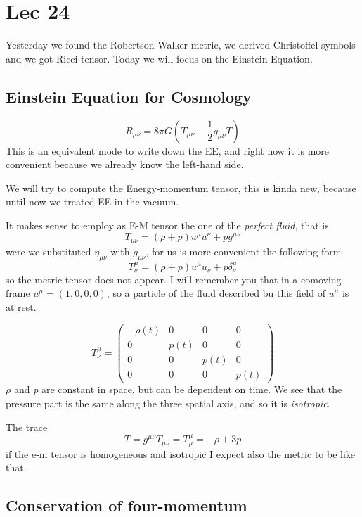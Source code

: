\section{Lec 24}
Yesterday we found the Robertson-Walker metric, we derived Christoffel symbols and we got Ricci tensor. Today we will focus on the Einstein Equation.
\subsection{Einstein Equation for Cosmology}
\[
R_{\mu \nu } = 8\pi G \left( T_{\mu \nu } - \frac{1}{2}g_{\mu \nu }T \right)
\]
This is an equivalent mode to write down the EE, and right now it is more convenient because we already know the left-hand side. \par
We will try to compute the Energy-momentum tensor, this is kinda new, because until now we treated EE in the vacuum.

It makes sense to employ as E-M tensor the one of the \emph{perfect fluid},  that is
\[
T_{\mu \nu } = \left( \rho +p \right)u^{\mu }u^{\nu }+ pg^{\mu \nu }
\]
were we substituted $\eta _{\mu \nu }$ with $g_{\mu \nu }$,  for us is more convenient the following form
\[
T^{\mu }_{\nu } = \left( \rho +p \right)u^{\mu }u_{\nu }+ p \delta ^{\mu }_{\nu }
\]
so the metric tensor does not appear.
I will remember you that in a comoving frame $u^{\mu } = \left( 1,0,0,0 \right)	$, so a particle of the fluid described bu this field of $u^{\mu }$ is at rest.	\par
\[
T^{\mu }_{\nu } = \begin{pmatrix}
-\rho \left( t \right) & 0 & 0 & 0 \\
0 & p\left( t \right) & 0 & 0 \\
0 & 0 & p\left( t \right) & 0 \\
0 & 0 & 0 & p\left( t \right)
\end{pmatrix} 
\]
$\rho $ and \emph{p} are constant in space, but can be dependent on time. We see that the pressure part is the same along the three spatial axis, and so it is \emph{isotropic}. \par
The trace
\[
T = g^{\mu \nu }T_{\mu \nu }= T^{\mu }_{\mu }=-\rho +3p
\]
if the e-m tensor is homogeneous and isotropic I expect also the metric to be like that.\par

\subsection{Conservation of four-momentum}

